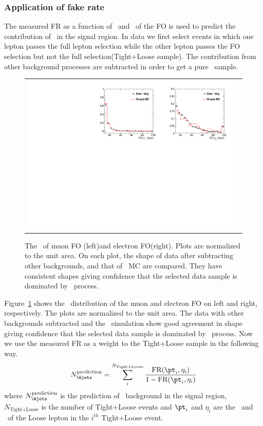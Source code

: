 \subsubsection{Application of fake rate}

The measured FR as a function of \pt\ and \Eta\ of the FO is used to predict the 
contribution of \Wjets\ in the signal region. In data we first select events 
in which one lepton passes the full lepton selection while the other lepton 
passes the FO selection but not the full selection(Tight+Loose sample). 
The contribution from other 
background processes are subtracted in order to get a pure \Wjets\ sample. 
\begin{figure}[htp] 
\centering 
\begin{tabular}{c} 
\includegraphics[width=1.00\textwidth]{figures/FOpT_0j_of.pdf} 
\end{tabular} 
\caption{The \pt\ of muon FO (left)and electron FO(right). 
Plots are normalized to the unit area. 
On each plot, the shape of data after subtracting other backgrounds,
and that of \Wjets\ MC are compared. 
They have consistent shapes giving confidence that the selected data sample 
is dominated by \Wjets\ process. } 
\label{fig:FOpT} 
\end{figure} 
Figure~\ref{fig:FOpT} shows the \pt\ distribution of the muon and electron FO
on left and right, respectively. The plots are normalized to the unit area.
The data with other backgrounds subtracted and the \Wjets\ simulation show good
agreement in shape giving confidence that the selected data sample
is dominated by \Wjets\ process. Now we use the measured FR as a weight to the 
Tight+Loose sample in the following way.   
\begin{eqnarray} 
N_{\Wjets}^{\textrm{prediction}} 
= \sum_i^{N_{\textrm{Tight+Loose}}} \frac{\textrm{FR}({\pt}_i, \eta_i)}{1 - \textrm{FR}({\pt}_i, \eta_i)}    
\end{eqnarray} 
where $N_{\Wjets}^{\textrm{prediction}}$ is the prediction of \Wjets\ background 
in the signal region, $N_{\textrm{Tight+Loose}}$ is the number of Tight+Loose events
and ${\pt}_i$ and $\eta_i$ are the \pt\ and \Eta\ of the Loose lepton in the $i^{th}$ 
Tight+Loose event.

